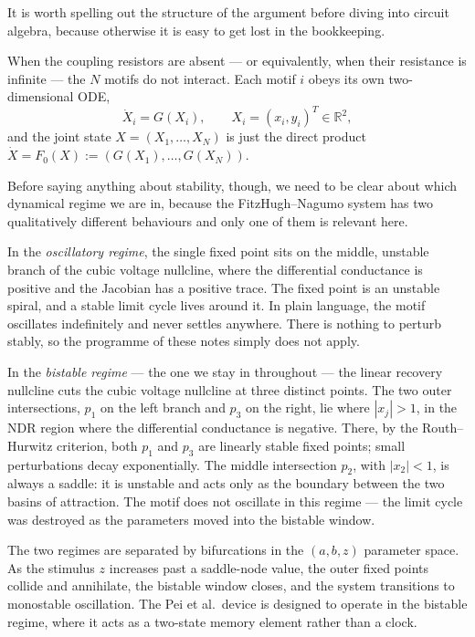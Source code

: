 \documentclass[11pt]{article}
\begin{document}
It is worth spelling out the structure of the argument before diving
into circuit algebra, because otherwise it is easy to get lost in the
bookkeeping.

When the coupling resistors are absent --- or equivalently, when their
resistance is infinite --- the $N$ motifs do not interact. Each motif
$i$ obeys its own two-dimensional ODE,
\begin{equation}
  \dot X_i = G(X_i),
  \qquad X_i = (x_i, y_i)^T \in \mathbb{R}^2,
  \label{eq:strategy_decoupled}
\end{equation}
and the joint state $X = (X_1,\ldots,X_N)$ is just the direct product
$\dot X = F_0(X) := (G(X_1),\ldots,G(X_N))$.

Before saying anything about stability, though, we need to be clear
about which dynamical regime we are in, because the FitzHugh--Nagumo
system has two qualitatively different behaviours and only one of them
is relevant here.

In the \emph{oscillatory regime}, the single fixed point sits on the
middle, unstable branch of the cubic voltage nullcline, where the
differential conductance is positive and the Jacobian has a positive
trace. The fixed point is an unstable spiral, and a stable limit cycle
lives around it. In plain language, the motif oscillates indefinitely
and never settles anywhere. There is nothing to perturb stably, so the
programme of these notes simply does not apply.

In the \emph{bistable regime} --- the one we stay in throughout --- the
linear recovery nullcline cuts the cubic voltage nullcline at three
distinct points. The two outer intersections, $p_1$ on the left branch
and $p_3$ on the right, lie where $|x_j| > 1$, in the NDR region where
the differential conductance is negative. There, by the Routh--Hurwitz
criterion, both $p_1$ and $p_3$ are linearly stable fixed points; small
perturbations decay exponentially. The middle intersection $p_2$, with
$|x_2| < 1$, is always a saddle: it is unstable and acts only as the
boundary between the two basins of attraction. The motif does not
oscillate in this regime --- the limit cycle was destroyed as the
parameters moved into the bistable window.

The two regimes are separated by bifurcations in the $(a, b, z)$
parameter space. As the stimulus $z$ increases past a saddle-node
value, the outer fixed points collide and annihilate, the bistable
window closes, and the system transitions to monostable oscillation.
The Pei et al.\ device is designed to operate in the bistable regime,
where it acts as a two-state memory element rather than a clock.
\end{document}
